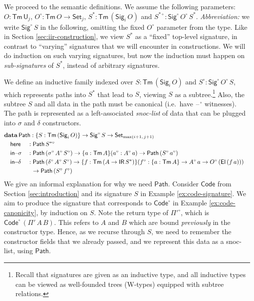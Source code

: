 \documentclass[acmsmall,screen,review]{acmart}
\newcommand{\msf}[1]{{\mathsf{#1}}}
\newcommand{\mbf}[1]{{\mathbf{#1}}}
\newcommand{\data}{\mbf{data}}
\newcommand{\U}{\msf{U}}
\newcommand{\Set}{\msf{Set}}
\newcommand{\El}{\msf{El}}
\newcommand{\Sig}{\msf{Sig}}
\newcommand{\Code}{\msf{Code}}
\newcommand{\blank}{{\mathord{\hspace{1pt}\text{--}\hspace{1pt}}}}
\newcommand{\IR}{\msf{IR}}
\newcommand{\Tm}{\msf{Tm}}
\newcommand{\w}{\circ}
\newcommand{\Path}{\msf{Path}}
\newcommand{\here}{\msf{here}}
\newcommand{\Ssw}{S^{*\w}}
\newcommand{\insigma}{\msf{in}\!\!-\!\!\sigma}
\newcommand{\indelta}{\msf{in}\!\!-\!\!\delta}
\begin{document}
We proceed to the semantic definitions. We assume the following parameters: $O : \Tm\,\U_j$, $O^\w :
\Tm\,O \to \Set_j$, $S^* : \Tm\,(\Sig_i\,O)$ and $S^{*\w} :
\Sig^\w\,O^\w\,S^*$. \emph{Abbreviation:} we write $\Sig^\w\,S$ in the following, omitting the fixed
$O^\w$ parameter from the type.  Like in Section \ref{sec:iir-construction}, we view $S^*$ as a
``fixed'' top-level signature, in contrast to ``varying'' signatures that we will encounter in
constructions. We will do induction on such varying signatures, but now the induction must happen
on \emph{sub-signatures} of $S^*$, instead of arbitrary signatures.

\begin{definition}
We define an inductive family indexed
over $S : \Tm\,(\Sig_i\,O)$ and $S^\w : \Sig^\w\,O^\w\,S$, which represents paths into $S^*$ that lead to $S$, viewing
$S$ as a subtree.\footnote{Recall that signatures are given as an inductive type, and all inductive types can be viewed as well-founded trees (W-types) equipped with subtree relations.} Also, the subtree $S$ and all data in the path must be canonical (i.e.\ have $\blank^\w$
witnesses). The path is represented as a left-associated \emph{snoc-list} of data that can be
plugged into $\sigma$ and $\delta$ constructors.
\begin{alignat*}{4}
  &\rlap{$\data\,\Path : \{S : \Tm\,(\Sig_i\,O)\} \to \Sig^\w\,S \to \Set_{\max(i+1,\,j+1)}$}\\
  &\quad \here    &&: \Path\,\Ssw\\
  &\quad \insigma &&: \Path\,(\sigma^\w\,A^\w\,S^\w) \to \{a : \Tm\,A\}(a^\w : A^\w\,a) \to \Path\,(S^\w\,a^\w) \\
  &\quad \indelta &&: \Path\,(\delta^\w\,A^\w\,S^\w) \to \{f : \Tm\,(A \to \IR\,S^*)\}(f^\w : \{a : \Tm\,A\} \to A^\w\,a \to O^\w\,(\El\,(f\,a)))\\
  &               && \hspace{0.6em} \to \Path\,(S^\w\,f^\w)
\end{alignat*}
We give an informal explanation for why we need $\Path$. Consider
$\Code$ from Section \ref{sec:introduction} and its signature $S$ in Example
\ref{ex:code-signature}. We aim to produce the signature that corresponds to $\Code^\w$ in Example
\ref{ex:code-canonicity}, by induction on $S$.  Note the return type of $\Pi'^\w$, which is
$\Code^\w\,(\Pi'\,A\,B)$. This refers to $A$ and $B$ which are bound \emph{previously} in the
constructor type. Hence, as we recurse through $S$, we need to remember the constructor fields that
we already passed, and we represent this data as a snoc-list, using $\Path$.


\end{definition}
\end{document}
